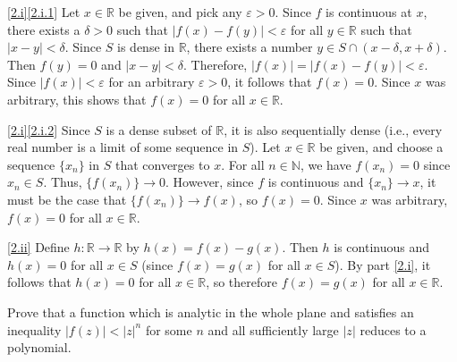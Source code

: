 \documentclass{homework}
\begin{document}
\begin{solution}
\ref{2.i}\ref{2.i.1}
Let $x \in \mathbb R$ be given, and pick any $\varepsilon > 0$.
Since $f$ is continuous at $x$, there exists a $\delta > 0$ such that
$|f(x) - f(y)| < \varepsilon$ for all $y \in \mathbb R$ such that
$|x - y| < \delta$.
Since $S$ is dense in $\mathbb R$, there exists a number
$y \in S \cap (x - \delta, x + \delta)$.
Then $f(y) = 0$ and $|x - y| < \delta$.
Therefore, $|f(x)| = |f(x) - f(y)| < \varepsilon$.
Since $|f(x)| < \varepsilon$ for an arbitrary $\varepsilon > 0$, it follows that
$f(x) = 0$.
Since $x$ was arbitrary, this shows that $f(x) = 0$ for all $x \in \mathbb R$.

\ref{2.i}\ref{2.i.2}
Since $S$ is a dense subset of $\mathbb R$, it is also sequentially dense (i.e.,
every real number is a limit of some sequence in $S$).
Let $x \in \mathbb R$ be given, and choose a sequence $\{x_n\}$ in $S$ that
converges to $x$.
For all $n \in \mathbb N$, we have $f(x_n) = 0$ since $x_n \in S$.
Thus, $\{f(x_n)\} \to 0$.
However, since $f$ is continuous and $\{x_n\} \to x$, it must be the case that
$\{f(x_n)\} \to f(x)$, so $f(x) = 0$.
Since $x$ was arbitrary, $f(x) = 0$ for all $x \in \mathbb R$.

\ref{2.ii}
Define $h : \mathbb R \to \mathbb R$ by $h(x) = f(x) - g(x)$.
Then $h$ is continuous and $h(x) = 0$ for all $x \in S$ (since $f(x) = g(x)$ for
all $x \in S$).
By part \ref{2.i}, it follows that $h(x) = 0$ for all $x \in \mathbb R$, so
therefore $f(x) = g(x)$ for all $x \in \mathbb R$.
\end{solution}

\begin{problem}[Ahlfors \S4.2.3 \#2, p. 123]
Prove that a function which is analytic in the whole plane and satisfies an
inequality $|f(z)| < |z|^n$ for some $n$ and all sufficiently large $|z|$
reduces to a polynomial.
\end{problem}
\end{document}

